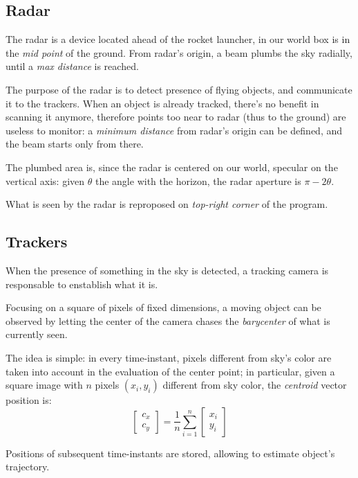 \documentclass[notitlepage,a4paper,11pt]{article} %
\begin{document}
	\subsection{Radar}
		The radar is a device located ahead of the rocket launcher, in our world box is in the \emph{mid point} of the ground. From radar's origin, a beam plumbs the sky radially, until a \emph{max distance} is reached.

		The purpose of the radar is to detect presence of flying objects, and communicate it to the trackers. When an object is already tracked, there's no benefit in scanning it anymore, therefore points too near to radar (thus to the ground) are useless to monitor: a \emph{minimum distance} from radar's origin can be defined, and the beam starts only from there.

		The plumbed area is, since the radar is centered on our world, specular on the vertical axis: given $\theta$ the angle with the horizon, the radar aperture is $\pi - 2\theta$.

		What is seen by the radar is reproposed on \emph{top-right corner} of the program.

	\subsection{Trackers}

		When the presence of something in the sky is detected, a tracking camera is responsable to enstablish what it is.

		Focusing on a square of pixels of fixed dimensions, a moving object can be observed by letting the center of the camera chases the \emph{barycenter} of what is currently seen.

		The idea is simple: in every time-instant, pixels different from sky's color are taken into account in the evaluation of the center point; in particular, given a square image with $n$ pixels $(x_i,y_i)$ different from sky color, the \emph{centroid} vector position is:
		\begin{equation}
			\begin{bmatrix} c_x \\ c_y \end{bmatrix} = \frac{1}{n} \sum_{i=1}^n \begin{bmatrix} x_i \\ y_i \end{bmatrix}
		\end{equation}

		Positions of subsequent time-instants are stored, allowing to estimate object's trajectory.
\end{document}
